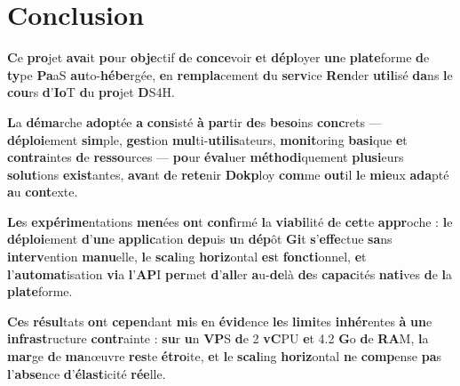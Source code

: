 \documentclass{rapportClass} %
\begin{document}
\chapter{Conclusion}

\textbf{C}e \textbf{pro}jet \textbf{ava}it \textbf{po}ur \textbf{obje}ctif \textbf{d}e \textbf{conce}voir \textbf{e}t \textbf{dépl}oyer \textbf{un}e \textbf{plate}forme
\textbf{d}e \textbf{ty}pe \textbf{Pa}aS \textbf{au}to-\textbf{hébe}rgée, \textbf{e}n \textbf{rempla}cement \textbf{d}u \textbf{serv}ice \textbf{Ren}der \textbf{util}isé
\textbf{da}ns \textbf{l}e \textbf{cou}rs \textbf{d}'\textbf{Io}T \textbf{d}u \textbf{pro}jet \textbf{D}S4H.

\textbf{L}a \textbf{déma}rche \textbf{adop}tée \textbf{a} \textbf{cons}isté \textbf{à} \textbf{par}tir \textbf{de}s \textbf{beso}ins \textbf{conc}rets —
\textbf{déploi}ement \textbf{sim}ple, \textbf{gest}ion \textbf{mul}ti-\textbf{utilis}ateurs, \textbf{monit}oring \textbf{basi}que \textbf{e}t
\textbf{contra}intes \textbf{d}e \textbf{resso}urces — \textbf{po}ur \textbf{éval}uer \textbf{méthodi}quement \textbf{plusi}eurs
\textbf{solut}ions \textbf{exist}antes, \textbf{ava}nt \textbf{d}e \textbf{rete}nir \textbf{Dokp}loy \textbf{com}me \textbf{out}il \textbf{l}e \textbf{mie}ux
\textbf{ada}pté \textbf{a}u \textbf{cont}exte.

\textbf{Le}s \textbf{expérime}ntations \textbf{men}ées \textbf{on}t \textbf{conf}irmé \textbf{l}a \textbf{viabi}lité \textbf{d}e \textbf{cet}te
\textbf{appr}oche : \textbf{l}e \textbf{déploi}ement \textbf{d}'\textbf{un}e \textbf{applic}ation \textbf{dep}uis \textbf{u}n \textbf{dép}ôt \textbf{Gi}t
\textbf{s}'\textbf{effe}ctue \textbf{sa}ns \textbf{interv}ention \textbf{manu}elle, \textbf{l}e \textbf{scal}ing \textbf{horiz}ontal \textbf{es}t
\textbf{foncti}onnel, \textbf{e}t \textbf{l}'\textbf{automat}isation \textbf{vi}a \textbf{l}'\textbf{AP}I \textbf{per}met \textbf{d}'\textbf{all}er \textbf{a}u-\textbf{de}là
\textbf{de}s \textbf{capac}ités \textbf{nati}ves \textbf{d}e \textbf{l}a \textbf{plate}forme.

\textbf{Ce}s \textbf{résul}tats \textbf{on}t \textbf{cepen}dant \textbf{mi}s \textbf{e}n \textbf{évid}ence \textbf{le}s \textbf{limi}tes \textbf{inhér}entes \textbf{à}
\textbf{un}e \textbf{infrast}ructure \textbf{contr}ainte : \textbf{su}r \textbf{u}n \textbf{VP}S \textbf{d}e 2 \textbf{vC}PU \textbf{e}t 4.2 \textbf{G}o \textbf{d}e
\textbf{RA}M, \textbf{l}a \textbf{mar}ge \textbf{d}e \textbf{ma}nœuvre \textbf{res}te \textbf{étro}ite, \textbf{e}t \textbf{l}e \textbf{scal}ing \textbf{horiz}ontal
\textbf{n}e \textbf{comp}ense \textbf{pa}s \textbf{l}'\textbf{abse}nce \textbf{d}'\textbf{élast}icité \textbf{rée}lle.
\end{document}
